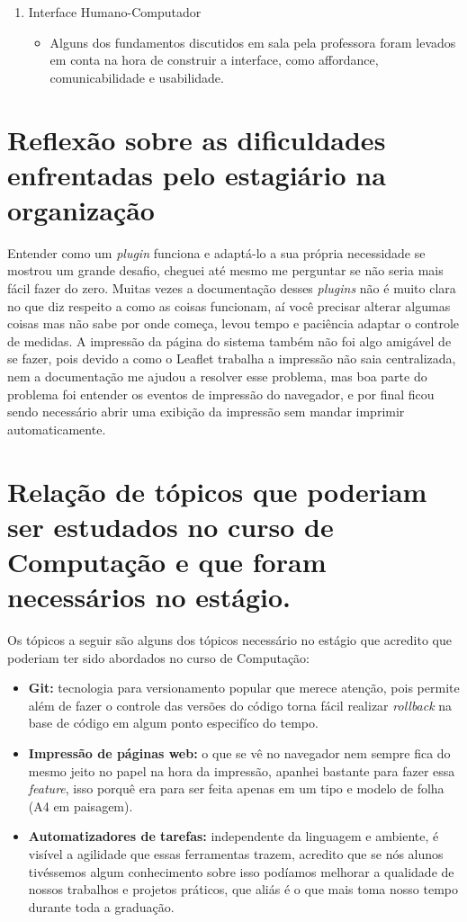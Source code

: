 \documentclass{ufscar}
\begin{document}
\begin{enumerate}
  \item Interface Humano-Computador
  \begin{itemize}
    \item Alguns dos fundamentos discutidos em sala pela professora foram levados em conta na hora de construir a interface, como affordance, comunicabilidade e usabilidade.
  \end{itemize}

\end{enumerate}

\section{Reflexão sobre as dificuldades enfrentadas pelo estagiário na organização}
Entender como um \textit{plugin} funciona e adaptá-lo a sua própria necessidade se mostrou um grande desafio, cheguei até mesmo me perguntar se não seria mais fácil fazer do zero. Muitas vezes a documentação desses \textit{plugins} não é muito clara no que diz respeito a como as coisas funcionam, aí você precisar alterar algumas coisas mas não sabe por onde começa, levou tempo e paciência adaptar o controle de medidas. A impressão da página do sistema também não foi algo amigável de se fazer, pois devido a como o Leaflet trabalha a impressão não saia centralizada, nem a documentação me ajudou a resolver esse problema, mas boa parte do problema foi entender os eventos de impressão do navegador, e por final ficou sendo necessário abrir uma exibição da impressão sem mandar imprimir automaticamente.

\section{Relação de tópicos que poderiam ser estudados no curso de Computação e que foram necessários no estágio.}
Os tópicos a seguir são alguns dos tópicos necessário no estágio que acredito que poderiam ter sido abordados no curso de Computação:
\begin{itemize}
  \item \textbf{Git:} tecnologia para versionamento popular que merece atenção, pois permite além de fazer o controle das versões do código torna fácil realizar \textit{rollback} na base de código em algum ponto especifíco do tempo.
  \item \textbf{Impressão de páginas web:} o que se vê no navegador nem sempre fica do mesmo jeito no papel na hora da impressão, apanhei bastante para fazer essa \textit{feature}, isso porquê era para ser feita apenas em um tipo e modelo de folha (A4 em paisagem).
  \item \textbf{Automatizadores de tarefas:} independente da linguagem e ambiente, é visível a agilidade que essas ferramentas trazem, acredito que se nós alunos tivéssemos algum conhecimento sobre isso podíamos melhorar a  qualidade de nossos trabalhos e projetos práticos, que aliás é o que mais toma nosso tempo durante toda a graduação.
\end{itemize}
\end{document}
